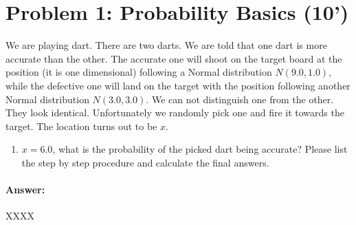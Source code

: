 \documentclass[12pt,letterpaper]{article}
\begin{document}
\section*{Problem 1: Probability Basics (10')} 

We are playing dart. There are two darts. We are told that one dart is more accurate than the other. 
The accurate one will shoot on the target board at the position (it is one dimensional) following a Normal distribution $N(9.0, 1.0)$, while the defective one will land on the target with the position following another Normal distribution $N(3.0, 3.0)$.
We can not distinguish one from the other. They look identical. 
Unfortunately we randomly pick one and fire it towards the target. The location turns out to be $x$.


\begin{enumerate}
  \item $x=6.0$, what is the probability of the picked dart being accurate? Please list the step by step procedure and calculate the final answers. 
\end{enumerate}


\paragraph{Answer:}

XXXX
\end{document}
